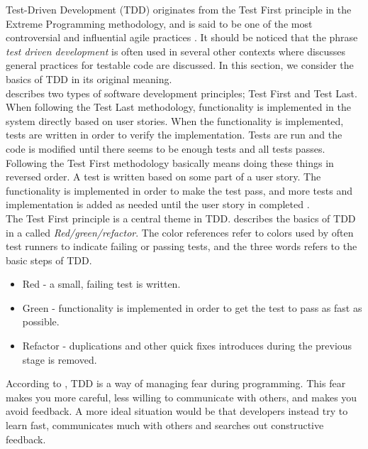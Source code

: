Test-Driven Development (TDD) originates from the Test First principle
in the Extreme Programming methodology, and is said to be one of the
most controversial and influential agile practices
\cite{book:tdd_madeyski}. It should be noticed that the phrase
\emph{test driven development} is often used in several other contexts
where discusses general practices for testable code are discussed. In
this section, we consider the basics of TDD in its original meaning.\\

\citet{book:tdd_madeyski} describes two types of software development
principles; Test First and Test Last. When following the Test Last
methodology, functionality is implemented in the system directly based
on user stories. When the functionality is implemented, tests are
written in order to verify the implementation. Tests are run and the
code is modified until there seems to be enough tests and all tests
passes.\\

Following the Test First methodology basically means doing these things
in reversed order. A test is written based on some part of a user story.
The functionality is implemented in order to make the test pass, and
more tests and implementation is added as needed until the user story in
completed \cite{book:tdd_madeyski}.\\

The Test First principle is a central theme in TDD.
\citet{book:tdd_beck} describes the basics of TDD in a 
called \emph{Red/green/refactor}. The color references refer to colors
used by often test runners to indicate failing or passing tests, and the
three words refers to the basic steps of TDD.

\begin{itemize}
    \item Red - a small, failing test is written.
    \item Green - functionality is implemented in order to get the test
          to pass as fast as possible.
    \item Refactor - duplications and other quick fixes introduces
          during the previous stage is removed.
\end{itemize}

According to \citeauthor{book:tdd_beck}, TDD is a way of managing fear
during programming. This fear makes you more careful, less willing to
communicate with others, and makes you avoid feedback. A more ideal
situation would be that developers instead try to learn fast,
communicates much with others and searches out constructive feedback.\\

